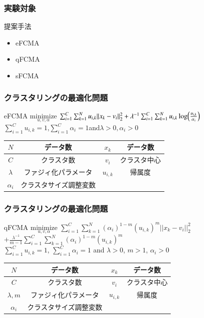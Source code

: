 \documentclass[13pt,dvipdfmx]{beamer}
\begin{document}
\begin{frame}\frametitle{実験対象}
  \begin{block}{提案手法}
    \begin{itemize}
    \item eFCMA
    \item qFCMA
    \item sFCMA
    \end{itemize}
  \end{block}
\end{frame}

\begin{frame}\frametitle{クラスタリングの最適化問題}
  \begin{block}{eFCMA}
    \quad$\underset{u,v,\alpha}{\text{minimize}}$
    $\sum_{i=1}^C\sum_{k=1}^Nu_{i,k}||x_k-v_i||_2^2+\lambda^{-1}\sum_{i=1}^C\sum_{k=1}^Nu_{i,k}\log\Bigl(\frac{u_{i,k}}{\alpha_{i}}\Bigl)$\\
    \qquad\qquad\qquad{}$\sum_{i=1}^Cu_{i,k}=1$\;,\;$\sum_{i=1}^C\alpha_{i}=1$\;and\;$\lambda>0,$\quad$\alpha_{i}>0$
  \end{block}
  \begin{center}
    \begin{tabular}{c|c||c|c} \hline
	  {$N$}&データ数&{$x_k$}&データ数 \\ \hline
	  {$C$}&クラスタ数&{$v_i$}&クラスタ中心\\ \hline
	  {$\lambda$}&ファジィ化パラメータ&{$u_{i,k}$}&帰属度 \\ \hline
	  {$\alpha_i$}&クラスタサイズ調整変数\\ \hline
    \end{tabular}
  \end{center}
\end{frame}

\begin{frame}\frametitle{クラスタリングの最適化問題}
  \begin{block}{qFCMA}
    \quad$\underset{u,v,\alpha}{\text{minimize}}$
    $\sum_{i=1}^C\sum_{k=1}^N(\alpha_{i})^{1-m}(u_{i,k})^m||x_k-v_i||_2^2$
    $+\frac{\lambda^{-1}}{m-1}\sum_{i=1}^C\sum_{k=1}^N(\alpha_{i})^{1-m}(u_{i,k})^m$\\
    \qquad{}$\sum_{i=1}^Cu_{i,k}=1$\;, \;$\sum_{i=1}^C\alpha_{i}=1$\; and \;$\lambda>0$\;, \;$m>1$\;, \;$\alpha_{i}>0$
  \end{block}
  \begin{center}
    \begin{tabular}{c|c||c|c} \hline
	  {$N$}&データ数&{$x_k$}&データ数 \\ \hline
	  {$C$}&クラスタ数&{$v_i$}&クラスタ中心\\ \hline
	  {$\lambda,m$}&ファジィ化パラメータ&{$u_{i,k}$}&帰属度 \\ \hline
	  {$\alpha_i$}&クラスタサイズ調整変数\\ \hline
    \end{tabular}
  \end{center}
\end{frame}
\end{document}
